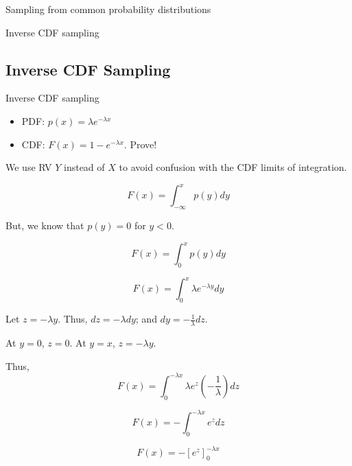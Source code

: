 \documentclass{beamer}
\begin{document}
\begin{section}{Sampling from common probability distributions}
\begin{frame}{Inverse CDF sampling}
\end{frame}

\subsection{Inverse CDF Sampling}
\begin{frame}{Inverse CDF sampling}
    \begin{itemize}
        \item \pause PDF: $p(x) = \lambda e^{-\lambda x}$
        \item \pause CDF: $F(x) = 1 - e^{-\lambda x}$. Prove!
        
    \end{itemize}

    \pause We use RV $Y$ instead of $X$ to avoid confusion with the CDF limits of integration. 

    \begin{equation}
        F(x) = \int_{-\infty}^{x} p(y) dy
    \end{equation}

   \pause But, we know that $p(y) = 0$ for $y < 0$.
    
   \pause \begin{equation}
        F(x) = \int_{0}^{x} p(y) dy
    \end{equation}

    \pause \begin{equation}
        F(x) = \int_{0}^{x} \lambda e^{-\lambda y} dy
    \end{equation}


    
\end{frame}

\begin{frame}
    
   Let $z = -\lambda y$. Thus, $dz = -\lambda dy$; and $dy = -\frac{1}{\lambda} dz$.

   \pause At $y=0$, $z=0$. At $y=x$, $z=-\lambda y$.

   Thus, \begin{equation}
         F(x) = \int_{0}^{-\lambda x} \lambda e^{z} \left(-\frac{1}{\lambda}\right) dz
    \end{equation}

    \pause \begin{equation}
         F(x) = -\int_{0}^{-\lambda x} e^{z} dz
    \end{equation}

    \pause \begin{equation}
         F(x) = -\left[e^{z}\right]_{0}^{-\lambda x}
    \end{equation}


\end{frame}
\end{section}
\end{document}
